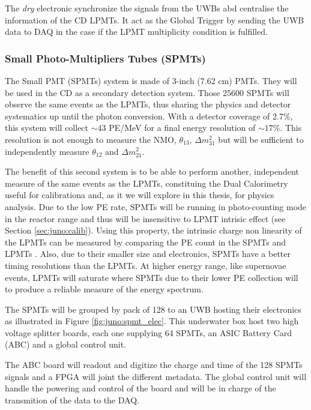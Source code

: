 \documentclass[../main.tex]{subfiles}
\begin{document}
The \textit{dry} electronic synchronize the signals from the UWBs abd centralise the information of the CD LPMTs. It act as the Global Trigger by sending the UWB data to DAQ in the case if the LPMT multiplicity condition is fulfilled.


\subsubsection{Small Photo-Multipliers Tubes (SPMTs)}
\label{sec:juno:SPMT}

The Small PMT (SPMTs) system is made of 3-inch (7.62 cm) PMTs. They will be used in the CD as a secondary detection system. Those 25600 SPMTs will observe the same events as the LPMTs, thus sharing the physics and detector systematics up until the photon conversion. With a detector coverage of 2.7\%, this system will collect $\sim 43$ PE/MeV for a final energy resolution of $\sim 17\%$. This resolution is not enough to measure the NMO, $\theta_{13}$, $\Delta m^2_{31}$ but will be sufficient to independently measure $\theta_{12}$ and $\Delta m^2_{21}$.

The benefit of this second system is to be able to perform another, independent measure of the same events as the LPMTs, constituing the Dual Calorimetry useful for calibrationa and, as it we will explore in this thesis, for physics analysis.
Due to the low PE rate, SPMTs will be running in photo-counting mode in the reactor range and thus will be insensitive to LPMT intrisic effect (see Section \ref{sec:juno:calib}). Using this property, the intrinsic charge non linearity of the LPMTs can be measured by comparing the PE count in the SPMTs and LPMTs \cite{han_dual_2021}. Also, due to their smaller size and electronics, SPMTs have a better timing resolutions than the LPMTs.
At higher energy range, like supernovae events, LPMTs will saturate where SPMTs due to their lower PE collection will to produce a reliable measure of the energy spectrum.

The SPMTs will be grouped by pack of 128 to an UWB hosting their electronics as illustrated in Figure \ref{fig:juno:spmt_elec}. This underwater box host two high voltage splitter boards, each one supplying 64 SPMTs, an ASIC Battery Card (ABC) and a global control unit.

The ABC board will readout and digitize the charge and time of the 128 SPMTs signals and a FPGA will joint the different metadata. The global control unit will handle the powering and control of the board and will be in charge of the transmition of the data to the DAQ.
\end{document}
